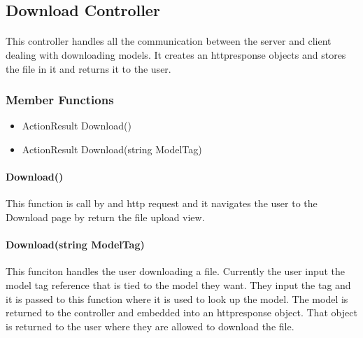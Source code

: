 \hypertarget{website_DownloadController}
{
    \label{website_DownloadController}
}

\subsection{Download Controller}
    \paragraph{}
        This controller handles all the communication between the server and client dealing with downloading models.
        It creates an httpresponse objects and stores the file in it and returns it to the user.

    \subsubsection{Member Functions}

        \begin{itemize}
            \item ActionResult Download()
            \item ActionResult Download(string ModelTag)
        \end{itemize}

        \paragraph{Download()}
            \hfill \break
            This function is call by and http request and it navigates the user to the Download page by return the file upload view.
    

        \paragraph{Download(string ModelTag)}
            \hfill \break
            This funciton handles the user downloading a file.
            Currently the user input the model tag reference that is tied to the model they want.
            They input the tag and it is passed to this function where it is used to look up the model.
            The model is returned to the controller and embedded into an httpresponse object.
            That object is returned to the user where they are allowed to download the file.
        